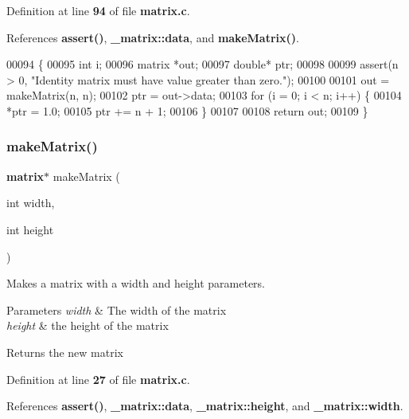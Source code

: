 Definition at line \textbf{ 94} of file \textbf{ matrix.\+c}.



References \textbf{ assert()}, \textbf{ \+\_\+matrix\+::data}, and \textbf{ make\+Matrix()}.


\begin{DoxyCode}
00094                               \{
00095     \textcolor{keywordtype}{int} i;
00096     matrix *out;
00097     \textcolor{keywordtype}{double}* ptr;
00098 
00099     assert(n > 0, \textcolor{stringliteral}{"Identity matrix must have value greater than zero."});
00100 
00101     out = makeMatrix(n, n);
00102     ptr = out->data;
00103     \textcolor{keywordflow}{for} (i = 0; i < n; i++) \{
00104         *ptr = 1.0;
00105         ptr += n + 1;
00106     \}
00107 
00108     \textcolor{keywordflow}{return} out;
00109 \}
\end{DoxyCode}
\mbox{\label{matrix_8h_aae8b56c6fb44d9147b835f4006ca872c}} 
\subsubsection{make\+Matrix()}
{\footnotesize\ttfamily \textbf{ matrix}$\ast$ make\+Matrix (\begin{DoxyParamCaption}\item[{int}]{width,  }\item[{int}]{height }\end{DoxyParamCaption})}



Makes a matrix with a width and height parameters. 


\begin{DoxyParams}{Parameters}
{\em width} & The width of the matrix \\
\hline
{\em height} & the height of the matrix \\
\hline
\end{DoxyParams}
\begin{DoxyReturn}{Returns}
the new matrix 
\end{DoxyReturn}


Definition at line \textbf{ 27} of file \textbf{ matrix.\+c}.



References \textbf{ assert()}, \textbf{ \+\_\+matrix\+::data}, \textbf{ \+\_\+matrix\+::height}, and \textbf{ \+\_\+matrix\+::width}.



